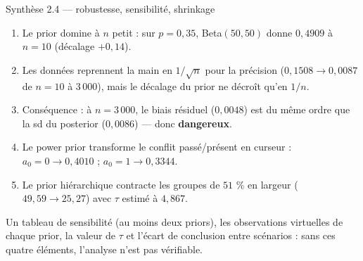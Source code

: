 \begin{frame}{Synthèse 2.4 — robustesse, sensibilité, shrinkage}
\begin{kbox}
\begin{enumerate}
  \item Le prior domine à $n$ petit : sur $p = 0{,}35$, Beta$(50,50)$ donne
        $0{,}4909$ à $n = 10$ (décalage $+0{,}14$).
  \item Les données reprennent la main en $1/\sqrt{n}$ pour la précision
        ($0{,}1508 \to 0{,}0087$ de $n = 10$ à $3\,000$), mais le décalage du
        prior ne décroît qu'en $1/n$.
  \item Conséquence : à $n = 3\,000$, le biais résiduel ($0{,}0048$) est du même
        ordre que la sd du posterior ($0{,}0086$) — donc \textbf{dangereux}.
  \item Le power prior transforme le conflit passé/présent en curseur :
        $a_0 = 0 \to 0{,}4010$ ; $a_0 = 1 \to 0{,}3344$.
  \item Le prior hiérarchique contracte les groupes de $51$ \% en largeur
        ($49{,}59 \to 25{,}27$) avec $\tau$ estimé à $4{,}867$.
\end{enumerate}
\end{kbox}
\vspace{1mm}
\begin{ebox}
Un tableau de sensibilité (au moins deux priors), les observations virtuelles de
chaque prior, la valeur de $\tau$ et l'écart de conclusion entre scénarios :
sans ces quatre éléments, l'analyse n'est pas vérifiable.
\end{ebox}
\end{frame}

